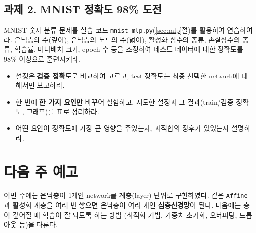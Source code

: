\documentclass[11pt,a4paper]{article}
\begin{document}
\subsection*{과제 2. MNIST 정확도 98\% 도전}

MNIST 숫자 분류 문제를 실습 코드 \texttt{mnist\_mlp.py}(\ref{sec:mlp}절)를 활용하여 연습하여라.
은닉층의 수(깊이), 은닉층의 노드의 수(넓이), 활성화 함수의 종류, 손실함수의 종류,
학습률, 미니배치 크기, epoch 수 등을 조정하여 테스트 데이터에 대한 정확도를 98\% 이상으로 훈련시켜라.
\begin{itemize}[leftmargin=1.8em]
\item 설정은 \textbf{검증 정확도}로 비교하여 고르고, test 정확도는 최종 선택한 network에 대해서만 보고하라.
\item 한 번에 \textbf{한 가지 요인만} 바꾸어 실험하고,
시도한 설정과 그 결과(train/검증 정확도, 그래프)를 표로 정리하라.
\item 어떤 요인이 정확도에 가장 큰 영향을 주었는지, 과적합의 징후가 있었는지 설명하라.
\end{itemize}

\section*{다음 주 예고}

이번 주에는 은닉층이 1개인 network를 계층(layer) 단위로 구현하였다.
같은 \texttt{Affine}과 활성화 계층을 여러 번 쌓으면 은닉층이 여러 개인 \textbf{심층신경망}이 된다.
다음에는 층이 깊어질 때 학습이 잘 되도록 하는 방법
(최적화 기법, 가중치 초기화, 오버피팅, 드롭아웃 등)을 다룬다.

\vfill
\end{document}
